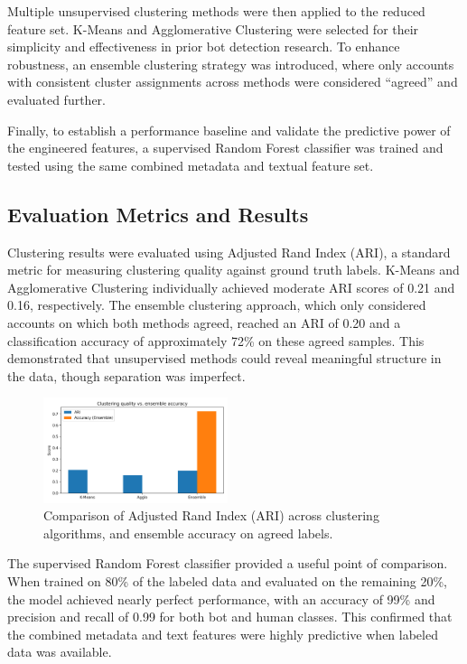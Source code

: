 \documentclass[10pt,twocolumn]{article}
\begin{document}
Multiple unsupervised clustering methods were then applied to the reduced feature set. K-Means and Agglomerative Clustering were selected for their simplicity and effectiveness in prior bot detection research. To enhance robustness, an ensemble clustering strategy was introduced, where only accounts with consistent cluster assignments across methods were considered ``agreed'' and evaluated further.

Finally, to establish a performance baseline and validate the predictive power of the engineered features, a supervised Random Forest classifier was trained and tested using the same combined metadata and textual feature set.

\subsection{Evaluation Metrics and Results}

Clustering results were evaluated using Adjusted Rand Index (ARI), a standard metric for measuring clustering quality against ground truth labels. K-Means and Agglomerative Clustering individually achieved moderate ARI scores of 0.21 and 0.16, respectively. The ensemble clustering approach, which only considered accounts on which both methods agreed, reached an ARI of 0.20 and a classification accuracy of approximately 72\% on these agreed samples. This demonstrated that unsupervised methods could reveal meaningful structure in the data, though separation was imperfect.

\begin{figure}[ht]
    \centering
    \includegraphics[width=0.48\textwidth]{clustering_metrics.png}
    \caption{Comparison of Adjusted Rand Index (ARI) across clustering algorithms, and ensemble accuracy on agreed labels.}
    \label{fig:clustering_metrics}
\end{figure}

The supervised Random Forest classifier provided a useful point of comparison. When trained on 80\% of the labeled data and evaluated on the remaining 20\%, the model achieved nearly perfect performance, with an accuracy of 99\% and precision and recall of 0.99 for both bot and human classes. This confirmed that the combined metadata and text features were highly predictive when labeled data was available.
\end{document}
